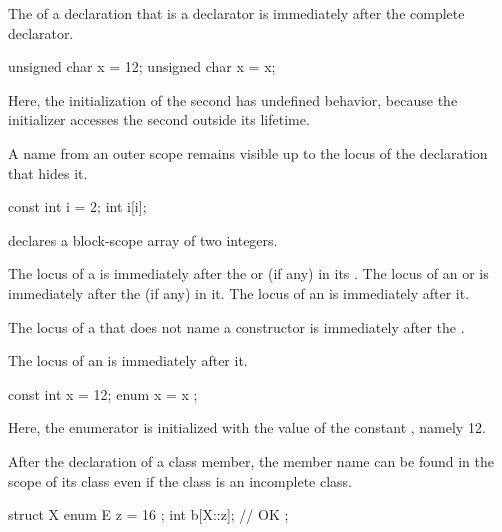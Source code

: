 %
%
%

\pnum
{}%
The  of a declaration that is a declarator
is immediately after the complete declarator.
\begin{example}
\begin{codeblock}
unsigned char x = 12;
{ unsigned char x = x; }
\end{codeblock}
Here, the initialization of the second  has undefined behavior,
because the initializer accesses the second 
outside its lifetime.
\end{example}

\pnum
\begin{note}
%
A name from an outer scope remains visible up to
the locus of the declaration that hides it.
\begin{example}
\begin{codeblock}
const int  i = 2;
{ int  i[i]; }
\end{codeblock}
declares a block-scope array of two integers.
\end{example}
\end{note}

\pnum
The locus of a  is immediately after
the  or  (if any)
in its .
The locus of
an  or 
is immediately after the  (if any)
in it.
The locus of an  is immediately after it.

\pnum
The locus of a 
that does not name a constructor
is immediately after the .

\pnum
The locus of an  is immediately after it.
\begin{example}
\begin{codeblock}
const int x = 12;
{ enum { x = x }; }
\end{codeblock}
Here, the enumerator  is initialized with the value of the
constant , namely 12.
\end{example}

\pnum
\begin{note}
%
After the declaration of a class member,
the member name can be found in the scope of its class
even if the class is an incomplete class.
\begin{example}
\begin{codeblock}
struct X {
  enum E { z = 16 };
  int b[X::z];          // OK
};
\end{codeblock}
\end{example}
\end{note}

